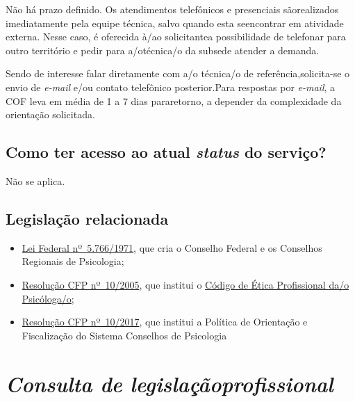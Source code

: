 Não há prazo definido. Os atendimentos telefônicos e presenciais sãorealizados imediatamente pela equipe técnica, salvo quando esta seencontrar em atividade externa. Nesse caso, é oferecida à/ao solicitantea possibilidade de telefonar para outro território e pedir para a/otécnica/o da subsede atender a demanda.

Sendo de interesse falar diretamente com a/o técnica/o de referência,solicita-se o envio de \emph{e-mail} e/ou contato telefônico posterior.Para respostas por \emph{e-mail}, a COF leva em média de 1 a 7 dias pararetorno, a depender da complexidade da orientação solicitada.

\section{Como ter acesso ao atual \emph{status} do serviço?}

Não se aplica.

\section{Legislação relacionada}

\begin{itemize}
  \item  \href{http://www.planalto.gov.br/ccivil_03/leis/l5766.htm}{Lei Federal  nº~5.766/1971}, que cria o Conselho Federal e os Conselhos Regionais  de Psicologia;
  \item  \href{https://atosoficiais.com.br/cfp/resolucao-do-exercicio-profissional-n-10-2005-aprova-o-codigo-de-etica-profissional-do-psicologo}{Resolução  CFP nº~10/2005}, que institui o  \href{https://www.crpsp.org/uploads/pagina/289379/2j9LIMPLJ9jFr5YrK57HmAiBWjVMxdbe.pdf}{Código  de Ética Profissional da/o Psicóloga/o};
  \item  \href{https://transparencia.cfp.org.br/wp-content/uploads/sites/10/2017/07/Resolu\%C3\%A7\%C3\%A3o-CFP-010-2017-Politica-de-Orienta\%C3\%A7\%C3\%A3o-e-Fiscaliza\%C3\%A7\%C3\%A3o-dos-Conselhos.pdf}{Resolução  CFP nº~10/2017}, que institui a Política de Orientação e Fiscalização  do Sistema Conselhos de Psicologia
\end{itemize}

\chapter{\texorpdfstring{\emph{Consulta de legislaçãoprofissional}}{Consulta de legislação profissional}}


